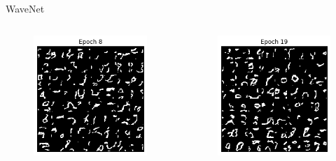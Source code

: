 \begin{frame}[allowframebreaks]{WaveNet}
\begin{columns}
\begin{column}{0.18\linewidth}
\begin{figure}
                \includegraphics[width=1\linewidth]{images/autoregressive/mnist/epoch-8.png}
            \end{figure}
        \end{column}
        \begin{column}{0.18\linewidth}
            \begin{figure}
                \centering
                \includegraphics[width=1\linewidth]{images/autoregressive/mnist/epoch-19.png}

\end{figure}
\end{column}
\end{columns}
\end{frame}
